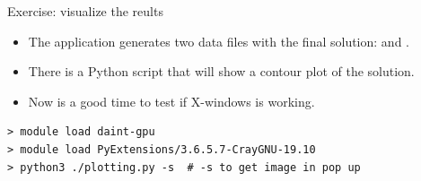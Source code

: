 \documentclass[aspectratio=43]{beamer}
\begin{document}
\begin{frame}[fragile]{Exercise: visualize the reults}
    \begin{itemize}
        \item The application generates two data files with the final solution:  and .
        \item There is a Python script that will show a contour plot  of the solution.
        \item Now is a good time to test if X-windows is working.
    \end{itemize}
\begin{lstlisting}[style=terminal]
> module load daint-gpu
> module load PyExtensions/3.6.5.7-CrayGNU-19.10
> python3 ./plotting.py -s  # -s to get image in pop up
\end{lstlisting}
\end{frame}

\end{document}
